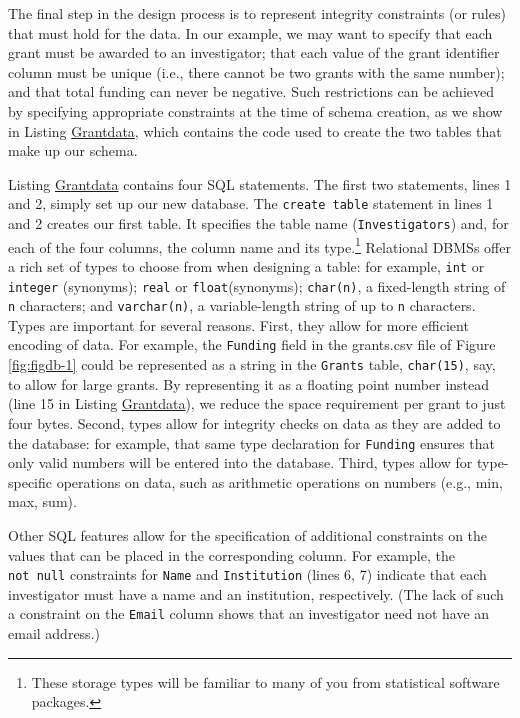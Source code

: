 \documentclass[]{krantz}
\begin{document}
The final step in the design process is to represent integrity
constraints (or rules) that must hold for the data. In our example, we
may want to specify that each grant must be awarded to an investigator;
that each value of the grant identifier column must be unique (i.e.,
there cannot be two grants with the same number); and that total funding
can never be negative. Such restrictions can be achieved by specifying
appropriate constraints at the time of schema creation, as we show in
Listing \protect\hyperlink{list:db1}{Grantdata}, which contains the code
used to create the two tables that make up our schema.

Listing \protect\hyperlink{list:db1}{Grantdata} contains four SQL
statements. The first two statements, lines 1 and 2, simply set up our
new database. The \texttt{create\ table} statement in lines 1 and 2
creates our first table. It specifies the table name
(\texttt{Investigators}) and, for each of the four columns, the column
name and its type.\footnote{These storage types will be familiar to many
  of you from statistical software packages.} Relational DBMSs offer a
rich set of types to choose from when designing a table: for example,
\texttt{int} or \texttt{integer} (synonyms); \texttt{real} or
\texttt{float}(synonyms); \texttt{char(n)}, a fixed-length string of
\texttt{n} characters; and \texttt{varchar(n)}, a variable-length string
of up to \texttt{n} characters. Types are important for several reasons.
First, they allow for more efficient encoding of data. For example, the
\texttt{Funding} field in the grants.csv file of Figure
\ref{fig:figdb-1} could be represented as a string in the
\texttt{Grants} table, \texttt{char(15)}, say, to allow for large
grants. By representing it as a floating point number instead (line 15
in Listing \protect\hyperlink{list:db1}{Grantdata}), we reduce the space
requirement per grant to just four bytes. Second, types allow for
integrity checks on data as they are added to the database: for example,
that same type declaration for \texttt{Funding} ensures that only valid
numbers will be entered into the database. Third, types allow for
type-specific operations on data, such as arithmetic operations on
numbers (e.g., min, max, sum).

Other SQL features allow for the specification of additional constraints
on the values that can be placed in the corresponding column. For
example, the \texttt{not\ null} constraints for \texttt{Name} and
\texttt{Institution} (lines 6, 7) indicate that each investigator must
have a name and an institution, respectively. (The lack of such a
constraint on the \texttt{Email} column shows that an investigator need
not have an email address.)
\end{document}
